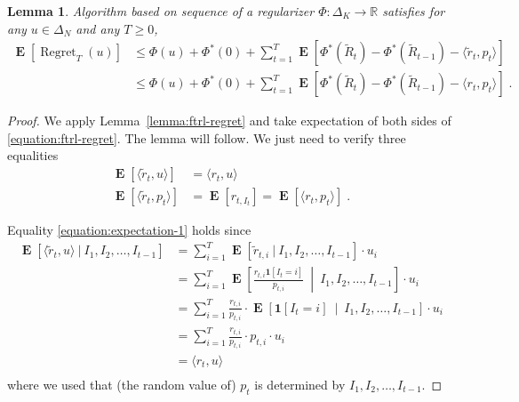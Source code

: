 \documentclass[12pt]{article}
\newtheorem{lemma}{Lemma}
\newcommand{\R}{\mathbb{R}}
\newcommand{\indicator}{\mathbf{1}}
\DeclareMathOperator{\Regret}{Regret}
\DeclareMathOperator{\Exp}{\mathbf{E}}
\begin{document}
\begin{lemma}
\label{lemma:ftrl-expected-regret}
Algorithm based on sequence of a regularizer $\Phi:\Delta_K \to \R$ satisfies
for any $u \in \Delta_N$ and any $T \ge 0$,
\begin{align*}
\Exp[\Regret_T(u)]
& \le \Phi(u) + \Phi^*(0) + \sum_{t=1}^T \Exp\left[\Phi^* \left(\widetilde R_t\right) - \Phi^*\left(\widetilde R_{t-1}\right) - \langle \widetilde r_t, p_t \rangle \right] \\
& \le \Phi(u) + \Phi^*(0) + \sum_{t=1}^T \Exp\left[\Phi^* \left(\widetilde R_t\right) - \Phi^*\left(\widetilde R_{t-1}\right) - \langle r_t, p_t \rangle \right] \; .
\end{align*}
\end{lemma}

\begin{proof}
We apply Lemma~\ref{lemma:ftrl-regret} and take expectation of both sides of \eqref{equation:ftrl-regret}.
The lemma will follow. We just need to verify three equalities
\begin{align}
\Exp[\langle \widetilde r_t, u \rangle] & = \langle r_t, u \rangle \label{equation:expectation-1} \\
\Exp[\langle \widetilde r_t, p_t \rangle] & = \Exp[r_{t,I_t}] = \Exp[\langle r_t, p_t \rangle] \label{equation:expectation-2} \; .
\end{align}

Equality \eqref{equation:expectation-1} holds since
\begin{align*}
\Exp[\langle \widetilde r_t, u \rangle ~|~ I_1, I_2, \dots, I_{t-1}]
& = \sum_{i=1}^T \Exp[\widetilde r_{t,i} ~|~ I_1, I_2, \dots, I_{t-1} ] \cdot u_i \\
& = \sum_{i=1}^T \Exp\left[  \frac{r_{t,i} \indicator[I_t=i]}{p_{t,i}} ~\middle|~ I_1, I_2, \dots, I_{t-1} \right] \cdot u_i \\
& = \sum_{i=1}^T \frac{r_{t,i}}{p_{t,i}} \cdot \Exp\left[ \indicator[I_t=i] ~\middle|~ I_1, I_2, \dots, I_{t-1} \right] \cdot u_i \\
& = \sum_{i=1}^T \frac{r_{t,i}}{p_{t,i}} \cdot p_{t,i}  \cdot u_i \\
& = \langle r_t, u \rangle \\
\end{align*}
where we used that (the random value of) $p_t$ is determined by $I_1, I_2, \dots, I_{t-1}$.


\end{proof}
\end{document}
